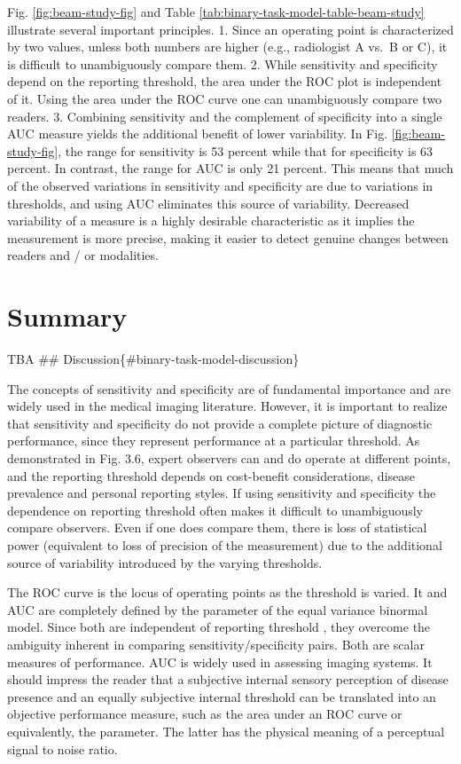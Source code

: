 \documentclass[
]{book}
\begin{document}
Fig. \ref{fig:beam-study-fig} and Table \ref{tab:binary-task-model-table-beam-study} illustrate several important principles.
1. Since an operating point is characterized by two values, unless both numbers are higher (e.g., radiologist A vs.~B or C), it is difficult to unambiguously compare them.
2. While sensitivity and specificity depend on the reporting threshold, the area under the ROC plot is independent of it. Using the area under the ROC curve one can unambiguously compare two readers.
3. Combining sensitivity and the complement of specificity into a single AUC measure yields the additional benefit of lower variability. In Fig. \ref{fig:beam-study-fig}, the range for sensitivity is 53 percent while that for specificity is 63 percent. In contrast, the range for AUC is only 21 percent. This means that much of the observed variations in sensitivity and specificity are due to variations in thresholds, and using AUC eliminates this source of variability. Decreased variability of a measure is a highly desirable characteristic as it implies the measurement is more precise, making it easier to detect genuine changes between readers and / or modalities.

\hypertarget{binary-task-model-summary}{%
\section{Summary}\label{binary-task-model-summary}}

TBA
\#\# Discussion\{\#binary-task-model-discussion\}

The concepts of sensitivity and specificity are of fundamental importance and are widely used in the medical imaging literature. However, it is important to realize that sensitivity and specificity do not provide a complete picture of diagnostic performance, since they represent performance at a particular threshold. As demonstrated in Fig. 3.6, expert observers can and do operate at different points, and the reporting threshold depends on cost-benefit considerations, disease prevalence and personal reporting styles. If using sensitivity and specificity the dependence on reporting threshold often makes it difficult to unambiguously compare observers. Even if one does compare them, there is loss of statistical power (equivalent to loss of precision of the measurement) due to the additional source of variability introduced by the varying thresholds.

The ROC curve is the locus of operating points as the threshold is varied. It and AUC are completely defined by the parameter of the equal variance binormal model. Since both are independent of reporting threshold , they overcome the ambiguity inherent in comparing sensitivity/specificity pairs. Both are scalar measures of performance. AUC is widely used in assessing imaging systems. It should impress the reader that a subjective internal sensory perception of disease presence and an equally subjective internal threshold can be translated into an objective performance measure, such as the area under an ROC curve or equivalently, the parameter. The latter has the physical meaning of a perceptual signal to noise ratio.
\end{document}
